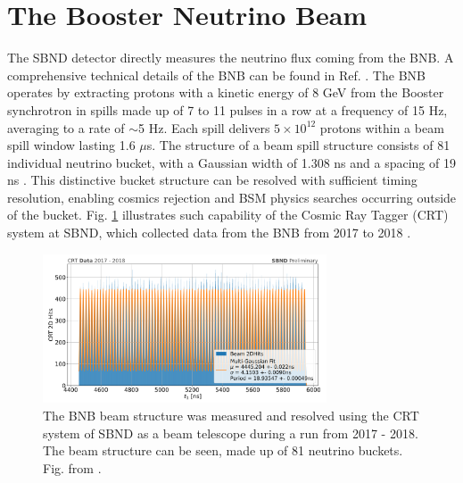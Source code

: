 \section{The Booster Neutrino Beam}

The SBND detector directly measures the neutrino flux coming from the BNB. 
A comprehensive technical details of the BNB can be found in Ref. \cite{BNBMiniBooNE}.
The BNB operates by extracting protons with a kinetic energy of 8 GeV from the Booster synchrotron in spills made up of 7 to 11 pulses in a row at a frequency of 15 Hz, averaging to a rate of $\sim$5 Hz.
Each spill delivers $5 \times 10^{12}$ protons within a beam spill window lasting 1.6 $\mu$s.
The structure of a beam spill structure consists of 81 individual neutrino bucket, with a Gaussian width of 1.308 ns and a spacing of 19 ns \cite{BNBsigma}.
This distinctive bucket structure can be resolved with sufficient timing resolution, enabling cosmics rejection and BSM physics searches occurring outside of the bucket.
Fig. \ref{fig:CRT2017} illustrates such capability of the Cosmic Ray Tagger (CRT) system at SBND, which collected data from the BNB from 2017 to 2018 \cite{CPAD2022}.

\begin{figure}[htbp] 
\centering    
\includegraphics[width=0.75\textwidth]{CRT2017}
\caption[CRT2017]{
The BNB beam structure was measured and resolved using the CRT system of SBND as a beam telescope during a run from 2017 - 2018.
The beam structure can be seen, made up of 81 neutrino buckets.
Fig. from \cite{CPAD2022}.
}
\label{fig:CRT2017}
\end{figure}

